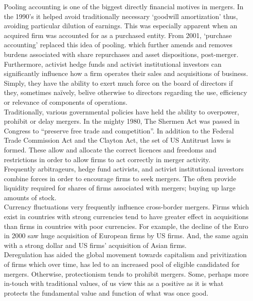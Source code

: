 \documentclass[11pt, english]{article}
\begin{document}
        Pooling accounting is one of the biggest directly financial motives in mergers. In the 1990's it helped avoid traditionally necessary `goodwill amortization' thus, avoiding particular dilution of earnings. This was especially apparent when an acquired firm was accounted for as a purchased entity. From 2001, `purchase accounting' replaced this idea of pooling. which further amends and removes burdens associated with share repurchases and asset dispositions, post-merger.\\

        Furthermore, activist hedge funds and activist institutional investors can significantly influence how a firm operates their sales and acquisitions of business. Simply, they have the ability to exert much force on the board of directors if they, sometimes na\"{i}vely, belive otherwise to directors regarding the use, efficiency or relevance of components of operations.\\

        Traditionally, various governmental policies have held the ability to overpower, prohibit or delay mergers. In the mighty 1980, The Shermen Act was passed in Congress to ``preserve free trade and competition''. In addition to the Federal Trade Commission Act and the Clayton Act, the set of US Antitrust laws is formed. These allow and allocate the correct licences and freedoms and restrictions in order to allow firms to act correctly in merger activity.\\

        Frequently arbitrageurs, hedge fund activists, and activist institutional investors combine forces in order to encourage firms to seek mergers. The often provide liquidity required for shares of firms associated with mergers; buying up large amounts of stock.\\

        Currency fluctuations very frequently influence cross-border mergers. Firms which exist in countries with strong currencies tend to have greater effect in acquisitions than firms in countries with poor currencies. For example, the decline of the Euro in 2000 saw huge acquisition of European firms by US firms. And, the same again with a strong dollar and US firms' acquisition of Asian firms.\\

        Deregulation has aided the global movement towards capitalism and privitization of firms which over time, has led to an increased pool of eligible candidated for mergers. Otherwise, protectionism tends to prohibit mergers. Some, perhaps more in-touch with traditional values, of us view this as a positive as it is what protects the fundamental value and function of what was once good.\\
\end{document}
